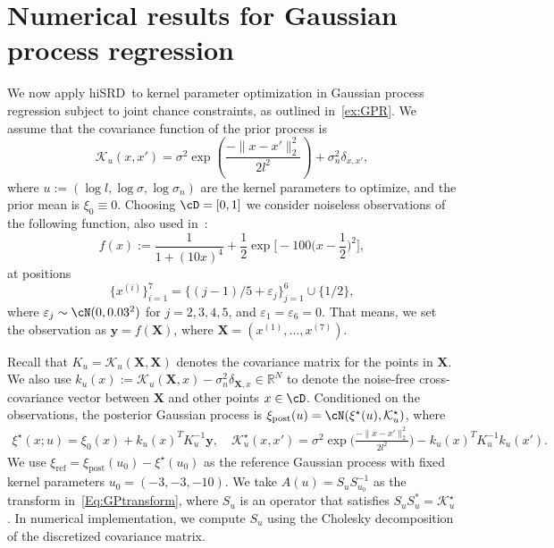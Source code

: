 \documentclass[%
onefignum,onetabnum]{siamonline250211}
\newcommand{\norm}[1]{\| #1 \|}
\newcommand{\bbR}{\mathbb R}
\newcommand{\cK}{\mathcal K} \newcommand{\cL}{\mathcal L}
\newcommand{\hiSRD}{{\sc hiSRD}}
\renewcommand{\epsilon}{\varepsilon}
\begin{document}
\section{Numerical results for Gaussian process regression}\label{SEC:NumGPR}
We now apply \hiSRD\ to kernel parameter optimization in Gaussian process regression subject to joint chance constraints, as outlined in~\cref{ex:GPR}. We assume that the covariance function of the prior process is %
\begin{equation}\label{Eq:GPkernel}
   \mathcal K_u(x,x')=\sigma^2\exp\left(\frac{-\|{x-x'}\|_2^2}{2l^2}\right)+\sigma_n^2\delta_{x,x'},
\end{equation}
where $u:=(\log{l},\log{\sigma},\log{\sigma_n})$ are the kernel parameters to optimize, and the prior mean is $\xi_0\equiv 0$. Choosing $\cD=[0,1]$ we consider noiseless observations of the following function, also used in~\cite{PeYaZh-TAML20}:
\begin{equation*}
    f(x):=\frac{1}{1+(10x)^4}+\frac{1}{2}\exp{\Big[ -100 \Big( x-\frac{1}{2} \Big)^2 \Big]},
\end{equation*}
at positions
\begin{equation*}
    \big\{ x^{(i)} \big\}_{i=1}^7=\big\{ {(j-1)/}{5}+\epsilon_j \big\}_{j=1}^6\cup \big\{ {1}/{2} \big\},
\end{equation*}
where $\epsilon_j\sim\cN(0,0.03^2)$ for $j=2,3,4,5$, and $\epsilon_1=\epsilon_6=0$. That means, we set the observation as $\boldsymbol{y}=f(\boldsymbol{X})$, where $\boldsymbol{X}=(x^{(1)},\dots,x^{(7)})$.

Recall that $K_u=\cK_u(\boldsymbol{X},\boldsymbol{X})$ denotes the covariance matrix for the points in $\boldsymbol X$. We also use $k_u(x):=\cK_u(\boldsymbol{X},x)-\sigma_n^2\delta_{\boldsymbol{X},x}\in\bbR^N$ to denote the noise-free cross-covariance vector between $\boldsymbol{X}$ and other points $x\in\cD$. Conditioned on the observations, the posterior Gaussian process is $\xi_{\mathrm{post}}(u)=\cN(\xi^\star(u),\cK^\star_u)$, where
\begin{gather*}
    \xi^\star(x;u)=\xi_0(x)+k_u(x)^T K_u^{-1}\boldsymbol{y}, \quad
    \cK^\star_u(x,x')=\sigma^2\exp\Big(\frac{-\norm{x-x'}_2^2}{2l^2}\Big)-k_u(x)^T K_u^{-1}k_u(x').
\end{gather*}
We use $\xi_{\mathrm{ref}}=\xi_{\mathrm{post}}(u_0)-\xi^\star(u_0)$ as the reference Gaussian process with fixed kernel parameters $u_0=(-3,-3,-10)$. We take $A(u) = S_u S_{u_0}^{-1}$ as the transform in~\eqref{Eq:GPtransform}, where $S_u$ is an operator that satisfies $S_u S_u^* = \cK^\star_u$. 
In numerical implementation, we compute $S_u$ using the Cholesky decomposition of the discretized covariance matrix.
\end{document}
